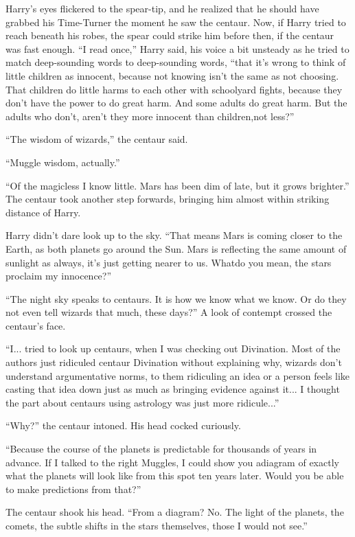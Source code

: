 Harry's eyes flickered to the spear-tip, and he realized that he should have grabbed his Time-Turner the moment he saw the centaur. Now, if Harry tried to reach beneath his robes, the spear could strike him before then, if the centaur was fast enough. “I read once,” Harry said, his voice a bit unsteady as he tried to match deep-sounding words to deep-sounding words, “that it's wrong to think of little children as innocent, because not knowing isn't the same as not choosing. That children do little harms to each other with schoolyard fights, because they don't have the power to do great harm. And some adults do great harm. But the adults who don't, aren't they more innocent than children,not less?”

“The wisdom of wizards,” the centaur said.

“Muggle wisdom, actually.”

“Of the magicless I know little. Mars has been dim of late, but it grows brighter.” The centaur took another step forwards, bringing him almost within striking distance of Harry.

Harry didn't dare look up to the sky. “That means Mars is coming closer to the Earth, as both planets go around the Sun. Mars is reflecting the same amount of sunlight as always, it's just getting nearer to us. Whatdo you mean, the stars proclaim my innocence?”

“The night sky speaks to centaurs. It is how we know what we know. Or do they not even tell wizards that much, these days?” A look of contempt crossed the centaur's face.

“I... tried to look up centaurs, when I was checking out Divination. Most of the authors just ridiculed centaur Divination without explaining why, wizards don't understand argumentative norms, to them ridiculing an idea or a person feels like casting that idea down just as much as bringing evidence against it... I thought the part about centaurs using astrology was just more ridicule...”

“Why?” the centaur intoned. His head cocked curiously.

“Because the course of the planets is predictable for thousands of years in advance. If I talked to the right Muggles, I could show you adiagram of exactly what the planets will look like from this spot ten years later. Would you be able to make predictions from that?”

The centaur shook his head. “From a diagram? No. The light of the planets, the comets, the subtle shifts in the stars themselves, those I would not see.”

